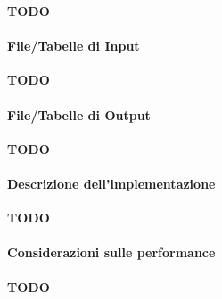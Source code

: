   \textbf{TODO}

  \paragraph{File/Tabelle di Input}\label{par:job1:spark:input}

  \textbf{TODO}

  \paragraph{File/Tabelle di Output}\label{par:job1:spark:output}

  \textbf{TODO}

  \paragraph{Descrizione dell'implementazione}\label{par:job1:spark:implementation}

  \textbf{TODO}

  \paragraph{Considerazioni sulle performance}\label{par:job1:spark:performance}

  \textbf{TODO}
